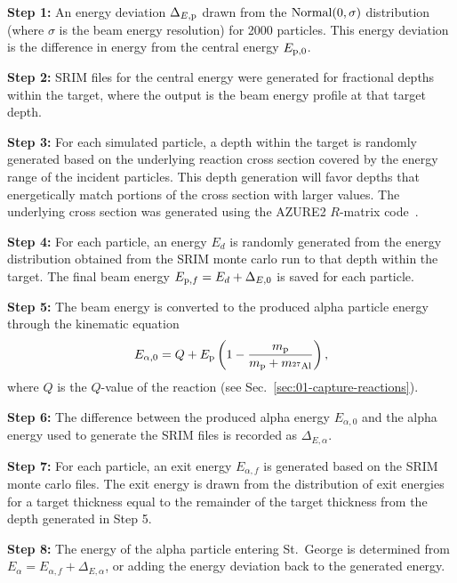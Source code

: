 \textbf{Step 1:}
  An energy deviation $\Delta_{E,{\rm p}}$ drawn from the ${\rm
  Normal}(0,\sigma)$ distribution (where $\sigma$ is the beam energy
  resolution) for 2000 particles. This energy deviation is the
  difference in energy from the central energy $E_{{\rm p},0}$.

\textbf{Step 2:}
  SRIM files for the central energy were generated for fractional depths
  within the target, where the output is the beam energy profile at that
  target depth.

\textbf{Step 3:}
  For each simulated particle, a depth within the target is randomly
  generated based on the underlying reaction cross section covered by
  the energy range of the incident particles. This depth generation will
  favor depths that energetically match portions of the cross section
  with larger values. The underlying cross section was generated using
  the AZURE2 $R$-matrix code~\cite{AZURE2, deBoer2017}.

\textbf{Step 4:}
  For each particle, an energy $E_d$ is randomly generated from the
  energy distribution obtained from the SRIM monte carlo run to that
  depth within the target. The final beam energy $E_{{\rm p},f} = E_d +
  \Delta_{E,0}$ is saved for each particle.

\textbf{Step 5:}
  The beam energy is converted to the produced alpha particle energy
  through the kinematic equation
  \[
      E_{\alpha,0} = Q + E_{\rm p}\left(
          1 - \frac{m_{\rm p}}{m_{\rm p} + m_{\mnuc{27}{Al}}} %
      \right),
  \]
  where $Q$ is the $Q$-value of the reaction (see
  Sec.~\ref{sec:01-capture-reactions}).

\textbf{Step 6:}
  The difference between the produced alpha energy $E_{\alpha,0}$ and
  the alpha energy used to generate the SRIM files is recorded as
  $\Delta_{E,\alpha}$.

\textbf{Step 7:}
  For each particle, an exit energy $E_{\alpha,f}$ is generated based on
  the SRIM monte carlo files. The exit energy is drawn from the
  distribution of exit energies for a target thickness equal to the
  remainder of the target thickness from the depth generated in Step 5.

\textbf{Step 8:}
  The energy of the alpha particle entering St.\ George is determined
  from $E_{\alpha} = E_{\alpha,f} + \Delta_{E,\alpha}$, or adding the
  energy deviation back to the generated energy.

